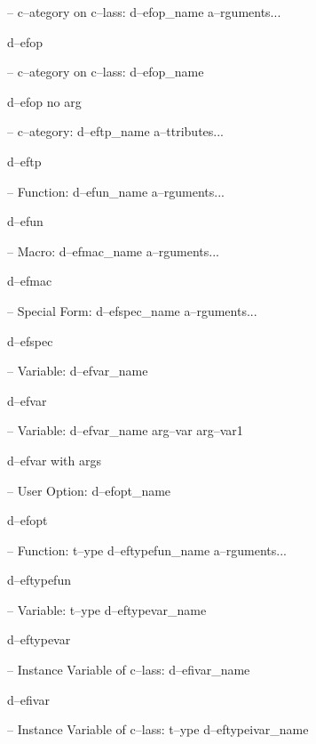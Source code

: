 \documentclass{book}
\begin{document}
\begin{titlepage}
\hbox{}-- c--ategory on c--lass: d--efop\_name a--rguments...


%
d--efop

\hbox{}-- c--ategory on c--lass: d--efop\_name


%
d--efop no arg

\hbox{}-- c--ategory: d--eftp\_name a--ttributes...


%
d--eftp

\hbox{}-- Function: d--efun\_name a--rguments...


%
d--efun

\hbox{}-- Macro: d--efmac\_name a--rguments...


%
d--efmac

\hbox{}-- Special Form: d--efspec\_name a--rguments...


%
d--efspec

\hbox{}-- Variable: d--efvar\_name


%
d--efvar

\hbox{}-- Variable: d--efvar\_name arg--var arg--var1


%
d--efvar with args

\hbox{}-- User Option: d--efopt\_name


%
d--efopt

\hbox{}-- Function: t--ype d--eftypefun\_name a--rguments...


%
d--eftypefun

\hbox{}-- Variable: t--ype d--eftypevar\_name


%
d--eftypevar

\hbox{}-- Instance Variable of c--lass: d--efivar\_name


%
d--efivar

\hbox{}-- Instance Variable of c--lass: t--ype d--eftypeivar\_name



\end{titlepage}
\end{document}
